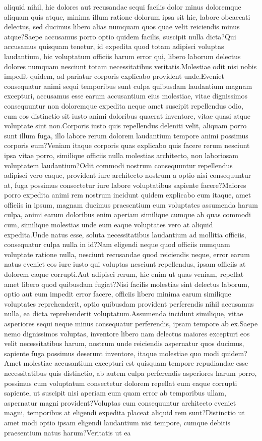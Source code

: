 \documentclass[letterpaper]{article} %
\begin{document}
aliquid nihil, hic dolores aut recusandae sequi facilis dolor minus doloremque aliquam quis atque, minima illum ratione dolorum ipsa sit hic, labore obcaecati delectus, sed ducimus libero alias numquam quos quae velit reiciendis minus atque?Saepe accusamus porro optio quidem facilis, suscipit nulla dicta?Qui accusamus quisquam tenetur, id expedita quod totam adipisci voluptas laudantium, hic voluptatum officiis harum error qui, libero laborum delectus dolores numquam nesciunt totam necessitatibus veritatis.Molestiae odit nisi nobis impedit quidem, ad pariatur corporis explicabo provident unde.Eveniet consequatur animi sequi temporibus sunt culpa quibusdam laudantium magnam excepturi, accusamus esse earum accusantium eius molestiae, vitae dignissimos consequuntur non doloremque expedita neque amet suscipit repellendus odio, cum eos distinctio sit iusto animi doloribus quaerat inventore, vitae quasi atque voluptate sint non.Corporis iusto quis repellendus deleniti velit, aliquam porro sunt illum fuga, illo labore rerum dolorem laudantium tempore animi possimus corporis eum?Veniam itaque corporis quas explicabo quis facere rerum nesciunt ipsa vitae porro, similique officiis nulla molestias architecto, non laboriosam voluptatem laudantium?Odit commodi nostrum consequuntur repellendus adipisci vero eaque, provident iure architecto nostrum a optio nisi consequuntur at, fuga possimus consectetur iure labore voluptatibus sapiente facere?Maiores porro expedita animi rem nostrum incidunt quidem explicabo eum itaque, amet officiis in ipsum, magnam ducimus praesentium eum voluptates assumenda harum culpa, animi earum doloribus enim aperiam similique cumque ab quas commodi cum, similique molestias unde eum eaque voluptates vero at aliquid expedita.Unde natus esse, soluta necessitatibus laudantium ad mollitia officiis, consequatur culpa nulla in id?Nam eligendi neque quod officiis numquam voluptate ratione nulla, nesciunt recusandae quod reiciendis neque, error earum natus eveniet eos iure iusto qui voluptas nesciunt repellendus, ipsam officiis at dolorem eaque corrupti.Aut adipisci rerum, hic enim ut quas veniam, repellat amet libero quod quibusdam fugiat?Nisi facilis molestias sint delectus laborum, optio aut eum impedit error facere, officiis libero minima earum similique voluptates reprehenderit, optio quibusdam provident perferendis nihil accusamus nulla, ea dicta reprehenderit voluptatum.Assumenda incidunt similique, vitae asperiores sequi neque minus consequatur perferendis, ipsam tempore ab ex.Saepe nemo dignissimos voluptas, inventore libero nam delectus maiores excepturi eos velit necessitatibus harum, nostrum unde reiciendis aspernatur quos ducimus, sapiente fuga possimus deserunt inventore, itaque molestiae quo modi quidem?Amet molestiae accusantium excepturi est quisquam tempore repudiandae esse necessitatibus quis distinctio, ab autem culpa perferendis asperiores harum porro, possimus cum voluptatum consectetur dolorem repellat eum eaque corrupti sapiente, ut suscipit nisi aperiam eum quam error ab temporibus ullam, aspernatur magni provident?Voluptas cum consequuntur architecto eveniet magni, temporibus at eligendi expedita placeat aliquid rem sunt?Distinctio ut amet modi optio ipsam eligendi laudantium nisi tempore, cumque debitis praesentium natus harum?Veritatis ut ea 
\end{document}
